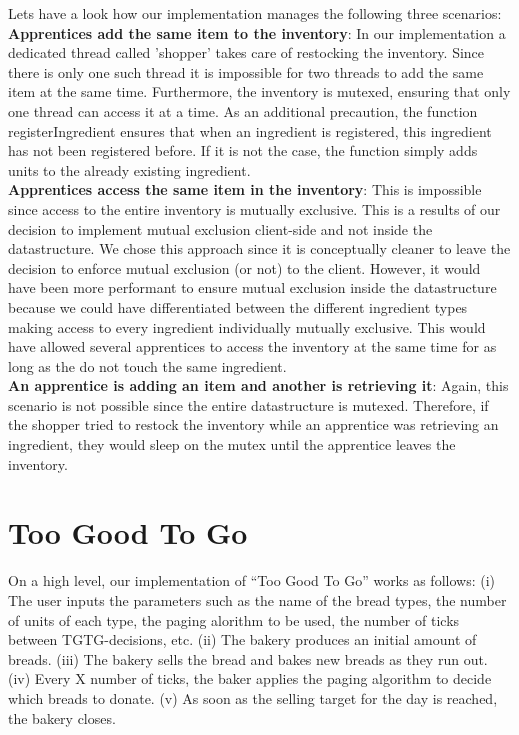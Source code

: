 \documentclass[11pt]{article}
\begin{document}
Lets have a look how our implementation manages the following three scenarios:\\

\textbf{Apprentices add the same item to the inventory}: In our implementation a dedicated thread called 'shopper' takes care of restocking the inventory. Since there is only one such thread it is impossible for two threads to add the same item at the same time. Furthermore, the inventory is mutexed, ensuring that only one thread can access it at a time. As an additional precaution, the function registerIngredient ensures that when an ingredient is registered, this ingredient has not been registered before. If it is not the case, the function simply adds units to the already existing ingredient.\\

\textbf{Apprentices access the same item in the inventory}: This is impossible since access to the entire inventory is mutually exclusive. This is a results of our decision to implement mutual exclusion client-side and not inside the datastructure. We chose this approach since it is conceptually cleaner to leave the decision to enforce mutual exclusion (or not) to the client. However, it would have been more performant to ensure mutual exclusion inside the datastructure because we could have differentiated between the different ingredient types making access to every ingredient individually mutually exclusive. This would have allowed several apprentices to access the inventory at the same time for as long as the do not touch the same ingredient.\\

\textbf{An apprentice is adding an item and another is retrieving it}: Again, this scenario is not possible since the entire datastructure is mutexed. Therefore, if the shopper tried to restock the inventory while an apprentice was retrieving an ingredient, they would sleep on the mutex until the apprentice leaves the inventory.\\

\section{Too Good To Go}
\label{sec:org5f1235b}

On a high level, our implementation of ``Too Good To Go'' works as follows: (i) The user inputs the parameters such as the name of the bread types, the number of units of each type, the paging alorithm to be used, the number of ticks between TGTG-decisions, etc. (ii) The bakery produces an initial amount of breads. (iii) The bakery sells the bread and bakes new breads as they run out. (iv) Every X number of ticks, the baker applies the paging algorithm to decide which breads to donate. (v) As soon as the selling target for the day is reached, the bakery closes.\\
\end{document}
